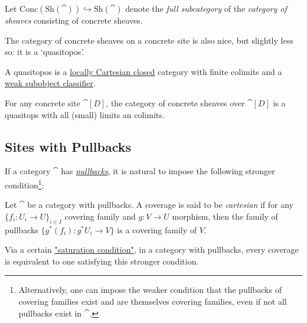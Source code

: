 \documentclass[a4paper,11pt]{article}  %
\begin{document}
\begin{definition} \label{ConcSheafOnConcSite}
Let $\mathrm{Conc}(\mathrm{Sh}(\cat)) \hookrightarrow \mathrm{Sh}(\cat)$ denote the \emph{full subcategory} of the \emph{category of sheaves} consisting of concrete sheaves.
\end{definition}



The category of concrete sheaves on a concrete site is also nice, but slightly less so: it is a ‘quasitopos’. 

\begin{definition}
A quasitopos is a \href{https://ncatlab.org/nlab/show/locally+cartesian+closed+category#definition}{locally Cartesian closed} category with finite colimits and a \href{https://ncatlab.org/nlab/show/subobject+classifier#weak_subobject_classifier}{weak subobject classifier}.
\end{definition}

\begin{theorem}
For any concrete site $\cat[D]$, the category of concrete sheaves over $\cat[D]$ is a quasitops with all (small) limits an colimits.
\end{theorem}

\subsection{Sites with Pullbacks}
%
If a category $\cat$ has \emph{\href{https://ncatlab.org/nlab/show/pullback}{pullbacks}}, it is natural to impose the following stronger condition\footnote{Alternatively, one can impose the weaker condition that the pullbacks of covering families exist and are themselves covering families, even if not all pullbacks exist in $\cat$.}:

\begin{definition}\label{Def:CartesianCover}
	Let $\cat$ be a category with pullbacks.
	A coverage is said to be \emph{cartesian} if for any \(\{f_i : U_i \to U\}_{i \in I}\)  covering family and \(g : V \to U\) morphism, then the family of pullbacks \(\{g^*(f_i) : g^*U_i \to V\}\) is a covering family of \(V\).
\end{definition}
Via a certain \href{https://ncatlab.org/nlab/show/coverage\#saturation_conditions}{"saturation condition"}, in a category with pullbacks, every coverage is equivalent to one satisfying this stronger condition.
\end{document}
